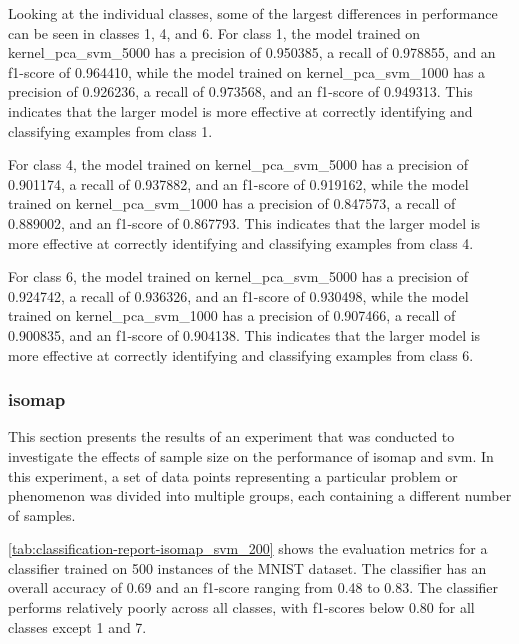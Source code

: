 Looking at the individual classes, some of the largest differences in performance can be seen in classes 1, 4, and 6. For class 1, the model trained on kernel\_pca\_svm\_5000 has a precision of 0.950385, a recall of 0.978855, and an f1-score of 0.964410, while the model trained on kernel\_pca\_svm\_1000 has a precision of 0.926236, a recall of 0.973568, and an f1-score of 0.949313. This indicates that the larger model is more effective at correctly identifying and classifying examples from class 1.

For class 4, the model trained on kernel\_pca\_svm\_5000 has a precision of 0.901174, a recall of 0.937882, and an f1-score of 0.919162, while the model trained on kernel\_pca\_svm\_1000 has a precision of 0.847573, a recall of 0.889002, and an f1-score of 0.867793. This indicates that the larger model is more effective at correctly identifying and classifying examples from class 4.

For class 6, the model trained on kernel\_pca\_svm\_5000 has a precision of 0.924742, a recall of 0.936326, and an f1-score of 0.930498, while the model trained on kernel\_pca\_svm\_1000 has a precision of 0.907466, a recall of 0.900835, and an f1-score of 0.904138. This indicates that the larger model is more effective at correctly identifying and classifying examples from class 6.

\subsubsection{\gls{isomap}}\label{subsubsec:experiment_4_isomap}
This section presents the results of an experiment that was conducted to investigate the effects of sample size on the performance of \gls{isomap} and \gls{svm}. In this experiment, a set of data points representing a particular problem or phenomenon was divided into multiple groups, each containing a different number of samples.



\ref{tab:classification-report-isomap_svm_200} shows the evaluation metrics for a classifier trained on 500 instances of the MNIST dataset. The classifier has an overall accuracy of 0.69 and an f1-score ranging from 0.48 to 0.83. The classifier performs relatively poorly across all classes, with f1-scores below 0.80 for all classes except 1 and 7.



